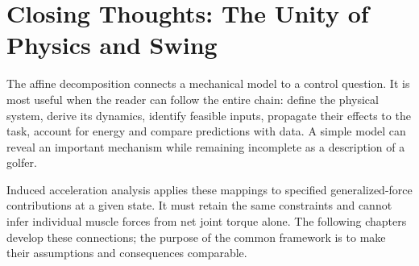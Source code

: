 \section*{Closing Thoughts: The Unity of Physics and Swing}
The affine decomposition connects a mechanical model to a control question. It is most useful when the reader can follow the entire chain: define the physical system, derive its dynamics, identify feasible inputs, propagate their effects to the task, account for energy and compare predictions with data. A simple model can reveal an important mechanism while remaining incomplete as a description of a golfer.

Induced acceleration analysis applies these mappings to specified generalized-force contributions at a given state. It must retain the same constraints and cannot infer individual muscle forces from net joint torque alone. The following chapters develop these connections; the purpose of the common framework is to make their assumptions and consequences comparable.

\flushbottom{}
